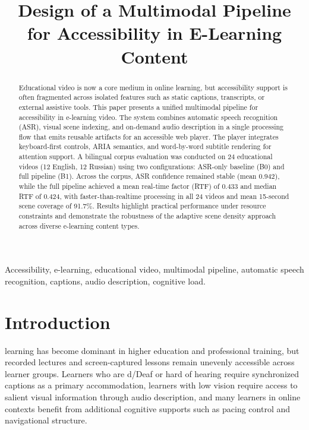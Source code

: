 \documentclass[conference]{IEEEtran}
\begin{document}
\title{Design of a Multimodal Pipeline for Accessibility in E-Learning Content\\
}

\author{
}

\maketitle

\begin{abstract}
Educational video is now a core medium in online learning, but accessibility support is often fragmented across isolated features such as static captions, transcripts, or external assistive tools. This paper presents a unified multimodal pipeline for accessibility in e-learning video. The system combines automatic speech recognition (ASR), visual scene indexing, and on-demand audio description in a single processing flow that emits reusable artifacts for an accessible web player. The player integrates keyboard-first controls, ARIA semantics, and word-by-word subtitle rendering for attention support. A bilingual corpus evaluation was conducted on 24 educational videos (12 English, 12 Russian) using two configurations: ASR-only baseline (B0) and full pipeline (B1). Across the corpus, ASR confidence remained stable (mean 0.942), while the full pipeline achieved a mean real-time factor (RTF) of 0.433 and median RTF of 0.424, with faster-than-realtime processing in all 24 videos and mean 15-second scene coverage of 91.7\%. Results highlight practical performance under resource constraints and demonstrate the robustness of the adaptive scene density approach across diverse e-learning content types.

\end{abstract}

\begin{IEEEkeywords}
Accessibility, e-learning, educational video, multimodal pipeline, automatic speech recognition, captions, audio description, cognitive load.
\end{IEEEkeywords}

\section{Introduction}
 learning has become dominant in higher education and professional training, but recorded lectures and screen-captured lessons remain unevenly accessible across learner groups. Learners who are d/Deaf or hard of hearing require synchronized captions as a primary accommodation, learners with low vision require access to salient visual information through audio description, and many learners in online contexts benefit from additional cognitive supports such as pacing control and navigational structure.
\end{document}

